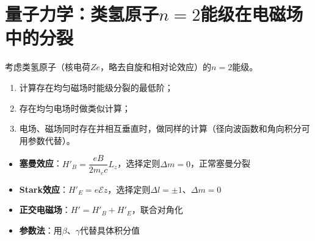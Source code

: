 \section{量子力学：类氢原子\texorpdfstring{$n=2$}{n=2}能级在电磁场中的分裂}
\label{sec:hydrogen-n2-em-splitting}

\begin{modelbox}[题目：类氢原子\texorpdfstring{$n=2$}{n=2}能级在电磁场中的分裂]
考虑类氢原子（核电荷$Ze$，略去自旋和相对论效应）的$n=2$能级。
\begin{enumerate}
    \item 计算存在均匀磁场时能级分裂的最低阶；
    \item 存在均匀电场时做类似计算；
    \item 电场、磁场同时存在并相互垂直时，做同样的计算（径向波函数和角向积分可用参数代替）。
\end{enumerate}
\end{modelbox}

\begin{tipbox}[考点快速分析]
\begin{itemize}
    \item \textbf{塞曼效应}：$H'_B=\dfrac{eB}{2m_ec}L_z$，选择定则$\Delta m=0$，正常塞曼分裂
    \item \textbf{Stark效应}：$H'_E=e\mathcal{E}z$，选择定则$\Delta l=\pm1$、$\Delta m=0$
    \item \textbf{正交电磁场}：$H'=H'_B+H'_E$，联合对角化
    \item \textbf{参数法}：用$\beta$、$\gamma$代替具体积分值
\end{itemize}
\end{tipbox}

